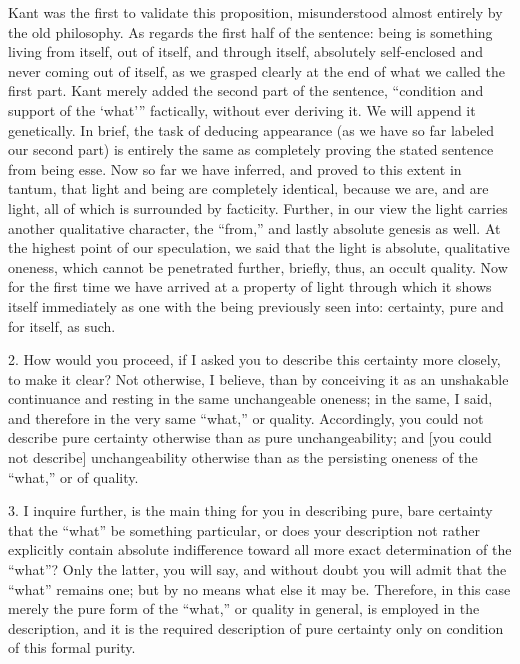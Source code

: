 Kant was the first to validate this proposition,
misunderstood almost entirely by the old philosophy.
As regards the first half of the sentence:
being is something living
from itself, out of itself, and through itself,
absolutely self-enclosed and never coming out of itself,
as we grasped clearly at the end of what we called the first part.
Kant merely added the second part of the sentence,
“condition and support of the ‘what'”
factically, without ever deriving it.
We will append it genetically.
In brief, the task of deducing appearance
(as we have so far labeled our second part)
is entirely the same as completely proving the
stated sentence from being {esse}.
Now so far we have inferred,
and proved to this extent {in tantum},
that light and being are completely identical,
because we are, and are light,
all of which is surrounded by facticity.
Further, in our view the light carries
another qualitative character, the “from,”
and lastly absolute genesis as well.
At the highest point of our speculation,
we said that the light is absolute, qualitative oneness,
which cannot be penetrated further,
briefly, thus, an occult quality.
Now for the first time we have arrived
at a property of light through which it shows itself
immediately as one with the being previously seen into:
certainty, pure and for itself, as such.

2. How would you proceed, if I asked you
to describe this certainty more closely, to make it clear?
Not otherwise, I believe, than by conceiving it
as an unshakable continuance and resting
in the same unchangeable oneness;
in the same, I said, and therefore
in the very same “what,” or quality.
Accordingly, you could not describe pure certainty otherwise
than as pure unchangeability;
and [you could not describe] unchangeability otherwise
than as the persisting oneness of the “what,” or of quality.

3. I inquire further, is the main thing for you
in describing pure, bare certainty
that the “what” be something particular,
or does your description not rather explicitly contain
absolute indifference toward all more exact determination of the “what”?
Only the latter, you will say, and without doubt
you will admit that the “what” remains one;
but by no means what else it may be.
Therefore, in this case merely the pure form of the “what,”
or quality in general, is employed in the description,
and it is the required description of pure certainty
only on condition of this formal purity.

